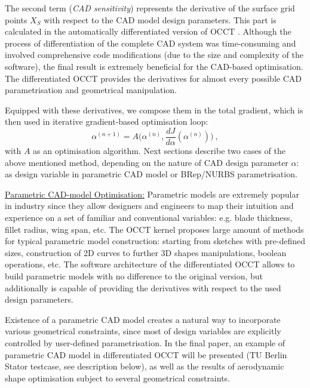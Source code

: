 \documentclass{article}
\begin{document}
The second term (\textit{CAD sensitivity}) represents the derivative of the surface grid points $X_S$ with respect to the CAD model design parameters. This part is calculated in the automatically differentiated version of OCCT \cite{auriemma2016optimisation}. Although the process of differentiation of the complete CAD system was time-consuming and involved comprehensive code modifications (due to the size and complexity of the software), the final result is extremely beneficial for the CAD-based optimisation. The differentiated OCCT provides the derivatives for almost every possible CAD parametrisation and geometrical manipulation. 

Equipped with these derivatives, we compose them in the total gradient, which is then used in iterative gradient-based optimisation loop:
\begin{equation}
\alpha^{(n+1)} =  A\big(\alpha^{(n)}, \frac{dJ}{d\alpha}(\alpha^{(n)})\big) \:,\end{equation}
with $A$ as an optimisation algorithm. 
Next sections describe two cases of the above mentioned method, depending on the nature of CAD design parameter $\alpha$: as design variable in parametric CAD model or BRep/NURBS parametrisation.



\vspace{10pt}
\noindent\underline{Parametric CAD-model Optimisation:}\vspace{0.2em}\newline
Parametric models are extremely popular in industry since they allow designers and engineers to map their intuition and experience on a set of familiar and conventional variables: e.g. blade thickness, fillet radius, wing span, etc. The OCCT kernel proposes large amount of methods for typical parametric model construction: starting from sketches with pre-defined sizes, construction of 2D curves to further 3D shapes manipulations, boolean operations, etc. The software architecture of the differentiated OCCT allows to build parametric models with no difference to the original version, but additionally is capable of providing the derivatives with respect to the used design parameters. 

Existence of a parametric CAD model creates a natural way to incorporate various geometrical constraints, since most of design variables are explicitly controlled by user-defined parametrisation. In the final paper, an example of parametric CAD model in differentiated OCCT will be presented (TU Berlin Stator testcase, see description below), as well as the results of aerodynamic shape optimisation subject to several geometrical constraints. 
\end{document}
